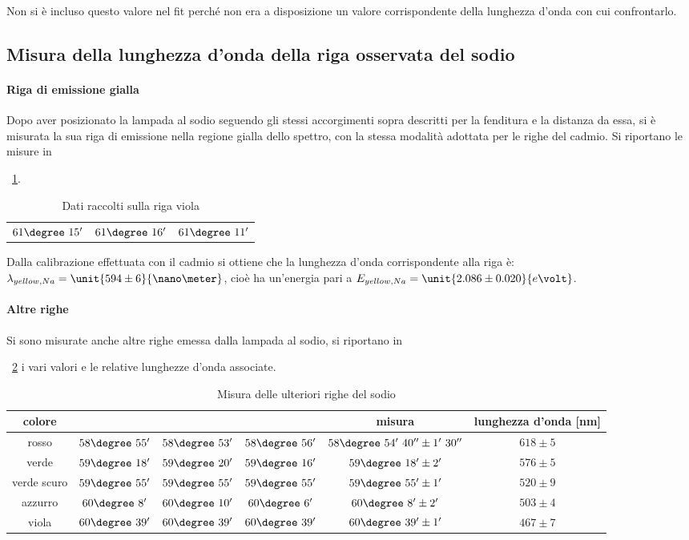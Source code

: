 \documentclass[a4paper,10pt]{article}
\begin{document}
{{{Non si è incluso questo valore nel fit perché non era a disposizione un valore corrispondente della lunghezza d'onda con cui confrontarlo.

\subsection{Misura della lunghezza d’onda della riga osservata del sodio}

\paragraph{Riga di emissione gialla}
Dopo aver posizionato la lampada al sodio seguendo gli stessi accorgimenti sopra descritti per la fenditura e la distanza da essa, si è misurata la sua riga di emissione nella regione gialla dello spettro, con la stessa modalità adottata per le righe del cadmio.
Si riportano le misure in \tablename{~\ref{tab:gialloNa}.

\begin{table}[H]
	\centering
	\begin{tabular}{c|c|c}
		$61\degree~15'$  & $61\degree~16'$ & $61\degree~11'$\\
	\end{tabular}
	\caption{Dati raccolti sulla riga viola}
	\label{tab:gialloNa}
\end{table}

Dalla calibrazione effettuata con il cadmio si ottiene che la lunghezza d'onda corrispondente alla riga è: $\lambda_{yellow, Na} = \unit{594 \pm 6}{\nano\meter}$, cioè ha un'energia pari a $E_{yellow, Na} = \unit{2.086\pm0.020}{e\volt}$.

\paragraph{Altre righe}

Si sono misurate anche altre righe emessa dalla lampada al sodio, si riportano in \tablename{~\ref{tab:moreNa} i vari valori e le relative lunghezze d'onda associate.

\begin{table}[H]
	\centering
	\begin{tabular}{c|c|c|c|c|c}
		colore &	&	&	& misura & lunghezza d'onda [nm]\\
		\hline
		rosso &	$58\degree~55'$ & $58\degree~53'$ & $58\degree~56'$ & $58\degree~54'~40'' \pm 1'~30''$ & $618 \pm 5$\\
		verde & $59\degree~18'$ & $59\degree~20'$ & $59\degree~16'$ & $59\degree~18' \pm 2'$  & $576 \pm 5$\\
		verde scuro & $59\degree~55'$ & $59\degree~55'$ & $59\degree~55'$ & $59\degree~55' \pm 1'$ & $520 \pm 9$\\
		azzurro & $60\degree~8'$ & $60\degree~10'$ & $60\degree~6'$ & $60\degree~8' \pm 2'$& $503 \pm 4$\\
		viola & $60\degree~39'$ & $60\degree~39'$ & $60\degree~39'$ & $60\degree~39' \pm 1'$ & $467 \pm 7$\\	
	\end{tabular}
	\caption{Misura delle ulteriori righe del sodio}
	\label{tab:moreNa}
\end{table}

}}}}}
\end{document}
